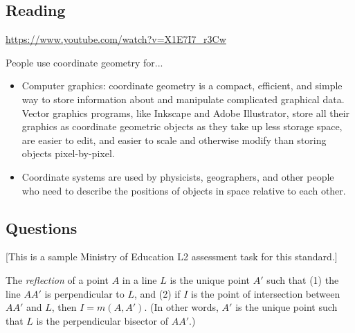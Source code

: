 



\subsection*{Reading}
\begin{center}
\begin{tcolorbox}[width=0.8\textwidth,colback={white},title={\textbf{Go and watch...}},colbacktitle=black,coltitle=white]
  \textcolor{black}{\url{https://www.youtube.com/watch?v=X1E7I7_r3Cw}}
\end{tcolorbox}
\end{center}

\begin{center}
\begin{tcolorbox}[width=0.8\textwidth,colback={white},title={\textbf{What's it good for?}},colbacktitle=MidnightBlue,coltitle=white]
  People use coordinate geometry for...
  \begin{itemize}
    \item Computer graphics: coordinate geometry is a compact, efficient, and simple way to store information about and manipulate
          complicated graphical data. Vector graphics programs, like Inkscape and Adobe Illustrator, store all their graphics as
          coordinate geometric objects as they take up less storage space, are easier to edit, and easier to scale and otherwise modify
          than storing objects pixel-by-pixel.
    \item Coordinate systems are used by physicists, geographers, and other people who need to describe the positions of objects in
          space relative to each other.
  \end{itemize}
\end{tcolorbox}
\end{center}

\subsection*{Questions}
[This is a sample Ministry of Education L2 assessment task for this standard.]

The \emph{reflection} of a point $ A $ in a line $ L $ is the unique point $ A' $ such that (1) the line $ AA'$ is
perpendicular to $ L $, and (2) if $ I $ is the point of intersection between $ AA' $ and $ L $, then $ I = m(A,A') $.
(In other words, $ A' $ is the unique point such that $ L $ is the perpendicular bisector of $ AA' $.)

